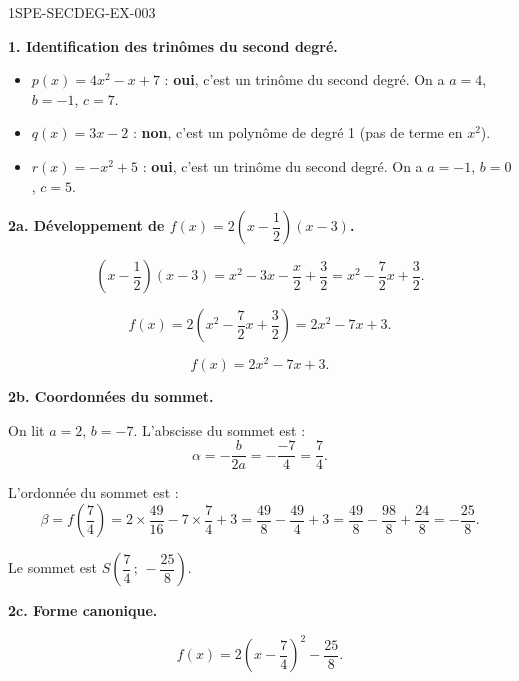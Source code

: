 \begin{corrige}{1SPE-SECDEG-EX-003}

\textbf{1. Identification des trinômes du second degré.}


\begin{itemize}
  \item $p(x) = 4x^2 - x + 7$ : \textbf{oui}, c'est un trinôme du second degré. On a $a = 4$, $b = -1$, $c = 7$.
  \item $q(x) = 3x - 2$ : \textbf{non}, c'est un polynôme de degré 1 (pas de terme en $x^2$).
  \item $r(x) = -x^2 + 5$ : \textbf{oui}, c'est un trinôme du second degré. On a $a = -1$, $b = 0$, $c = 5$.
\end{itemize}

\medskip
\textbf{2a. Développement de $f(x) = 2\!\left(x - \dfrac{1}{2}\right)\!(x - 3)$.}


\[\left(x - \frac{1}{2}\right)(x - 3) = x^2 - 3x - \frac{x}{2} + \frac{3}{2} = x^2 - \frac{7}{2}x + \frac{3}{2}.\]

\[f(x) = 2\!\left(x^2 - \frac{7}{2}x + \frac{3}{2}\right) = 2x^2 - 7x + 3.\]

\[\boxed{f(x) = 2x^2 - 7x + 3.}\]

\medskip
\textbf{2b. Coordonnées du sommet.}

On lit $a = 2$, $b = -7$. L'abscisse du sommet est :
\[\alpha = -\frac{b}{2a} = -\frac{-7}{4} = \frac{7}{4}.\]

L'ordonnée du sommet est :
\[\beta = f\!\left(\frac{7}{4}\right) = 2\times\frac{49}{16} - 7\times\frac{7}{4} + 3 = \frac{49}{8} - \frac{49}{4} + 3 = \frac{49}{8} - \frac{98}{8} + \frac{24}{8} = -\frac{25}{8}.\]

Le sommet est $S\!\left(\dfrac{7}{4}\,;\,-\dfrac{25}{8}\right)$.

\medskip
\textbf{2c. Forme canonique.}


\[\boxed{f(x) = 2\left(x - \frac{7}{4}\right)^2 - \frac{25}{8}.}\]

\end{corrige}
